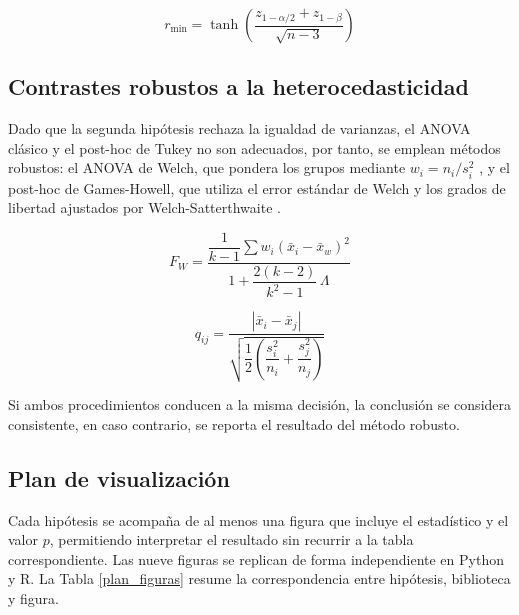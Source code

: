         \begin{equation}
            r_{\min} = \tanh\!\left(\frac{z_{1-\alpha/2} + z_{1-\beta}}
                                         {\sqrt{n-3}}\right)
            \label{rdetectable}
        \end{equation}

    \subsection{Contrastes robustos a la heterocedasticidad}
        \label{subsec_robustez}
        Dado que la segunda hipótesis rechaza la igualdad de varianzas,
        el ANOVA clásico y el post-hoc de Tukey no son adecuados, por tanto, 
        se emplean métodos robustos: el ANOVA de Welch, que pondera los grupos
        mediante $w_i=n_i/s_i^2$ \cite{welch1951comparison}, y el post-hoc de
        Games-Howell, que utiliza el error estándar de Welch y los grados de
        libertad ajustados por Welch-Satterthwaite \cite{games1976pairwise}.

        \begin{equation}
            F_W = \frac{\dfrac{1}{k-1}\sum w_i (\bar{x}_i - \bar{x}_w)^2}
                       {1 + \dfrac{2(k-2)}{k^2-1}\,\Lambda}
            \label{welchanova}
        \end{equation}

        \begin{equation}
            q_{ij} = \frac{|\bar{x}_i - \bar{x}_j|}
                          {\sqrt{\dfrac{1}{2}\left(\dfrac{s_i^2}{n_i}
                                 + \dfrac{s_j^2}{n_j}\right)}}
            \label{gameshowell}
        \end{equation}

        Si ambos procedimientos conducen a la misma decisión, la conclusión se 
        considera consistente, en caso contrario, se reporta el resultado del 
        método robusto.

    \subsection{Plan de visualización}
        \label{subsec_plan_visual}
        Cada hipótesis se acompaña de al menos una figura que incluye el
        estadístico y el valor $p$, permitiendo interpretar el resultado sin
        recurrir a la tabla correspondiente. Las nueve figuras se replican de
        forma independiente en Python y R. La Tabla \ref{plan_figuras} resume la
        correspondencia entre hipótesis, biblioteca y figura.

